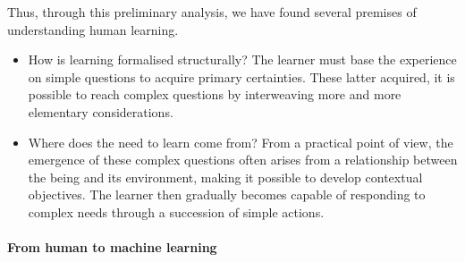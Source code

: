 Thus, through this preliminary analysis, we have found several premises of understanding human learning.

\begin{itemize}
    \item How is learning formalised structurally?
    The learner must base the experience on simple questions to acquire primary certainties. These latter acquired, it is possible to reach complex questions by interweaving more and more elementary considerations.
    \item Where does the need to learn come from?
    From a practical point of view, the emergence of these complex questions often arises from a relationship between the being and its environment, making it possible to develop contextual objectives. The learner then gradually becomes capable of responding to complex needs through a succession of simple actions.
\end{itemize}
 
\paragraph{From human to machine learning} 



